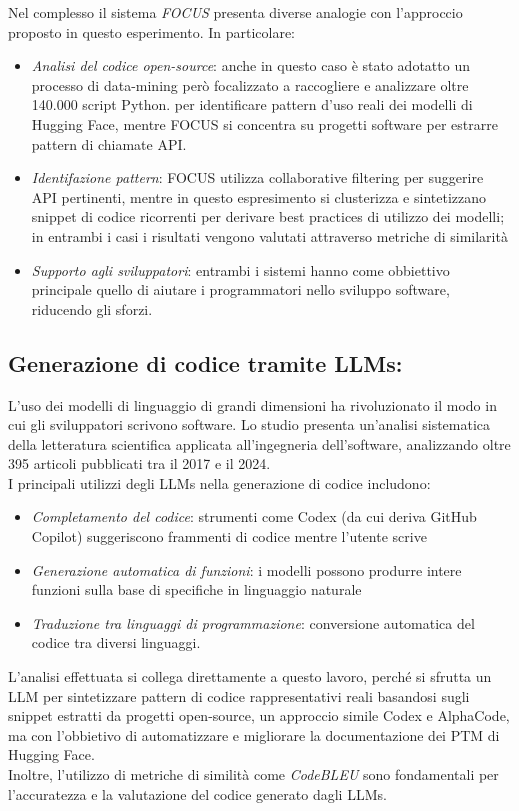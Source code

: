 \documentclass{article}
\begin{document}
Nel complesso il sistema \textit{FOCUS} presenta diverse analogie con l'approccio proposto in questo esperimento. In particolare:
\begin{itemize}
    \item \textit{Analisi del codice open-source}: anche in questo caso è stato adotatto un processo di data-mining però focalizzato a raccogliere e analizzare oltre 140.000 script Python. per identificare pattern d’uso reali dei modelli di Hugging Face, mentre FOCUS si concentra su progetti software per estrarre pattern di chiamate API.
    \item \textit{Identifazione pattern}: FOCUS utilizza collaborative filtering per suggerire API pertinenti, mentre in questo espresimento si clusterizza e sintetizzano snippet di codice ricorrenti per derivare best practices di utilizzo dei modelli; in entrambi i casi i risultati vengono valutati attraverso metriche di similarità
    \item \textit{Supporto agli sviluppatori}: entrambi i sistemi hanno come obbiettivo principale quello di aiutare i programmatori nello sviluppo software, riducendo gli sforzi.
\end{itemize}


\subsection{Generazione di codice tramite LLMs:}
L’uso dei modelli di linguaggio di grandi dimensioni ha rivoluzionato il modo in cui gli sviluppatori scrivono software. Lo studio\cite{hou2024large} presenta un'analisi sistematica della letteratura scientifica applicata all'ingegneria dell'software, analizzando oltre 395 articoli pubblicati tra il 2017 e il 2024.\\
I principali utilizzi degli LLMs nella generazione di codice includono:
\begin{itemize}
    \item \textit{Completamento del codice}: strumenti come Codex (da cui deriva GitHub Copilot) suggeriscono frammenti di codice mentre l’utente scrive
    \item \textit{Generazione automatica di funzioni}: i modelli possono produrre intere funzioni sulla base di specifiche in linguaggio naturale
    \item \textit{Traduzione tra linguaggi di programmazione}: conversione automatica del codice tra diversi linguaggi.
\end{itemize}
L'analisi effettuata si collega direttamente a questo lavoro, perché si sfrutta un LLM per sintetizzare pattern di codice rappresentativi reali basandosi sugli snippet estratti da progetti open-source, un approccio simile Codex e AlphaCode, ma con l'obbietivo di automatizzare e migliorare la documentazione dei PTM di Hugging Face.\\
Inoltre, l'utilizzo di metriche di similità come \textit{CodeBLEU} sono fondamentali per l'accuratezza e la valutazione del codice generato dagli LLMs.
\end{document}
